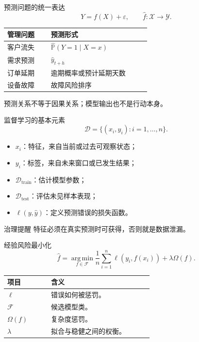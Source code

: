 \documentclass[UTF8,fontset=fandol,aspectratio=169,11pt]{ctexbeamer}
\begin{document}
\begin{frame}{预测问题的统一表达}
\[
  Y=f(X)+\varepsilon,
  \qquad
  \hat f:\mathcal X\rightarrow \mathcal Y.
\]
\begin{center}
\begin{tabular}{p{0.25\linewidth}p{0.58\linewidth}}
\toprule
管理问题 & 预测形式\\
\midrule
客户流失 & \(\widehat{\mathbb P}(Y=1\mid X=x)\)\\
需求预测 & \(\hat y_{t+h}\)\\
订单延期 & 逾期概率或预计延期天数\\
设备故障 & 故障风险排序\\
\bottomrule
\end{tabular}
\end{center}
\small
预测关系不等于因果关系；模型输出也不是行动本身。
\end{frame}

\begin{frame}{监督学习的基本元素}
\[
  \mathcal D=\{(x_i,y_i):i=1,\ldots,n\}.
\]
\begin{itemize}
  \item \(x_i\)：特征，来自当前或过去可观察状态；
  \item \(y_i\)：标签，来自未来窗口或已发生结果；
  \item \(\mathcal D_{\mathrm{train}}\)：估计模型参数；
  \item \(\mathcal D_{\mathrm{test}}\)：评估未见样本表现；
  \item \(\ell(y,\hat y)\)：定义预测错误的损失函数。
\end{itemize}
\begin{block}{治理提醒}
特征必须在真实预测时可获得，否则就是数据泄漏。
\end{block}
\end{frame}

\begin{frame}{经验风险最小化}
\[
  \hat f
  =
  \operatorname*{arg\,min}_{f\in\mathcal F}
  \frac{1}{n}\sum_{i=1}^{n}\ell(y_i,f(x_i))
  +
  \lambda\Omega(f).
\]
\begin{center}
\begin{tabular}{p{0.24\linewidth}p{0.56\linewidth}}
\toprule
项目 & 含义\\
\midrule
\(\ell\) & 错误如何被惩罚。\\
\(\mathcal F\) & 候选模型类。\\
\(\Omega(f)\) & 复杂度惩罚。\\
\(\lambda\) & 拟合与稳健之间的权衡。\\
\bottomrule
\end{tabular}
\end{center}
\end{frame}
\end{document}
